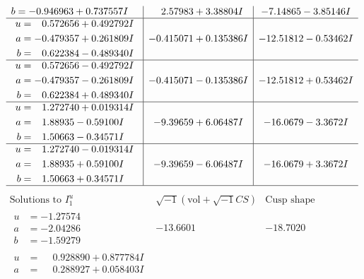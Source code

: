 \documentclass[1p]{elsarticle_modified}
\theoremstyle{definition}
\newcommand{\I}{\sqrt{-1}}
\begin{document}
$$\begin{array}{c|c|c}
\begin{aligned}
b &= -0.946963 + 0.737557 I\end{aligned}
 & \phantom{-}2.57983 + 3.38804 I & -7.14865 - 3.85146 I \\ \hline\begin{aligned}
u &= \phantom{-}0.572656 + 0.492792 I \\
a &= -0.479357 + 0.261809 I \\
b &= \phantom{-}0.622384 - 0.489340 I\end{aligned}
 & -0.415071 + 0.135386 I & -12.51812 - 0.53462 I \\ \hline\begin{aligned}
u &= \phantom{-}0.572656 - 0.492792 I \\
a &= -0.479357 - 0.261809 I \\
b &= \phantom{-}0.622384 + 0.489340 I\end{aligned}
 & -0.415071 - 0.135386 I & -12.51812 + 0.53462 I \\ \hline\begin{aligned}
u &= \phantom{-}1.272740 + 0.019314 I \\
a &= \phantom{-}1.88935 - 0.59100 I \\
b &= \phantom{-}1.50663 - 0.34571 I\end{aligned}
 & -9.39659 + 6.06487 I & -16.0679 - 3.3672 I \\ \hline\begin{aligned}
u &= \phantom{-}1.272740 - 0.019314 I \\
a &= \phantom{-}1.88935 + 0.59100 I \\
b &= \phantom{-}1.50663 + 0.34571 I\end{aligned}
 & -9.39659 - 6.06487 I & -16.0679 + 3.3672 I\\
 \hline 
 \end{array}$$\newpage$$\begin{array}{c|c|c}  
\text{Solutions to }I^u_{1}& \I (\text{vol} + \sqrt{-1}CS) & \text{Cusp shape}\\
 \hline 
\begin{aligned}
u &= -1.27574\phantom{ +0.000000I} \\
a &= -2.04286\phantom{ +0.000000I} \\
b &= -1.59279\phantom{ +0.000000I}\end{aligned}
 & -13.6601\phantom{ +0.000000I} & -18.7020\phantom{ +0.000000I} \\ \hline\begin{aligned}
u &= \phantom{-}0.928890 + 0.877784 I \\
a &= \phantom{-}0.288927 + 0.058403 I \\

\end{aligned}
\end{array}$$
\end{document}
